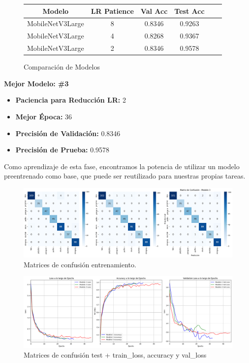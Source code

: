 \begin{figure}[H]
    \centering
    \begin{tabular}{|c|c|c|c|c|c|}
        \hline
        \textbf{Modelo} & \textbf{LR Patience} & \textbf{Val Acc} & \textbf{Test Acc} \\ \hline
        MobileNetV3Large & 8 & 0.8346 & 0.9263 \\ \hline
        MobileNetV3Large & 4 & 0.8268 & 0.9367 \\ \hline
        MobileNetV3Large & 2 & 0.8346 & 0.9578 \\ \hline
    \end{tabular}
    \caption{Comparación de Modelos}
\end{figure}

\begin{center}
    \textbf{Mejor Modelo: \#3}
\end{center}

\begin{itemize}
    \item \textbf{Paciencia para Reducción LR:} 2
    \item \textbf{Mejor Época:} 36
    \item \textbf{Precisión de Validación:} 0.8346
    \item \textbf{Precisión de Prueba:} 0.9578
\end{itemize}

\quad

\noindent
Como aprendizaje de esta fase, encontramos la potencia de utilizar un modelo preentrenado como base, que puede ser reutilizado para nuestras propias tareas.
\quad

\begin{figure}[H]
    \centering
    \centering
    \includegraphics[width=\textwidth]{imagenes/train_fine2.png}
    \caption{Matrices de confusión entrenamiento.}
    \label{fig:confusion_matrix}
\end{figure}

\begin{figure}[H]
    \centering
    \centering
    \includegraphics[width=\textwidth]{imagenes/train_fine.png}
    \caption{Matrices de confusión test + train\_loss, accuracy y val\_loss}
    \label{fig:loss_accuracy_validation}
\end{figure}
